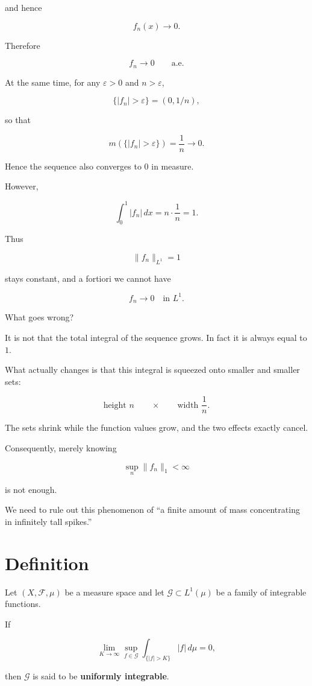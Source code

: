 \documentclass[11pt]{article}
\begin{document}
and hence

\[
f_n(x)\to0.
\]

Therefore

\[
f_n\to0
\qquad\text{a.e.}
\]

At the same time, for any $\varepsilon>0$ and $n>\varepsilon$,

\[
\{|f_n|>\varepsilon\}
=
(0,1/n),
\]

so that

\[
m(\{|f_n|>\varepsilon\})
=
\frac1n\to0.
\]

Hence the sequence also converges to $0$ in measure.

However,

\[
\int_0^1|f_n|\,dx = n\cdot\frac{1}{n} = 1.
\]

Thus

\[
\|f_n\|_{L^1}=1
\]

stays constant, and a fortiori we cannot have

\[
f_n\to0
\quad\text{in }L^1.
\]

What goes wrong?

It is not that the total integral of the sequence grows. In fact it is always equal to $1$.

What actually changes is that this integral is squeezed onto smaller and smaller sets:

\[
\text{height }n
\qquad
\times
\qquad
\text{width }\frac1n.
\]

The sets shrink while the function values grow, and the two effects exactly cancel.

Consequently, merely knowing

\[
\sup_n\|f_n\|_1<\infty
\]

is not enough.

We need to rule out this phenomenon of ``a finite amount of mass concentrating in infinitely tall spikes.''


\section{Definition}


Let $(X,\mathcal F,\mu)$ be a measure space and let $\mathcal G\subset L^1(\mu)$ be a family of integrable functions.

If

\[
\lim_{K\to\infty}
\sup_{f\in\mathcal G}
\int_{\{|f|>K\}}|f|\,d\mu
=
0,
\]

then $\mathcal G$ is said to be \textbf{uniformly integrable}.
\end{document}
